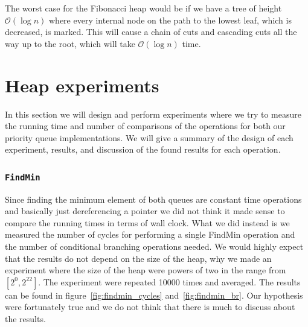 \documentclass[a4paper,oneside,article,11pt]{memoir}
\begin{document}
The worst case for the Fibonacci heap would be if we have a tree of height $\mathcal{O}(\log n)$ where every internal node on the path to the lowest leaf, which is decreased, is marked. This will cause a chain of cuts and cascading cuts all the way up to the root, which will take $\mathcal{O}(\log n)$ time.

\chapter{Heap experiments}
In this section we will design and perform experiments where we try to measure the running time and number of comparisons of the operations for both our priority queue implementations. We will give a summary of the design of each experiment, results, and discussion of the found results for each operation.

\subsection{\texttt{FindMin}}
Since finding the minimum element of both queues are constant time operations and basically just dereferencing a pointer we did not think it made sense to compare the running times in terms of wall clock. What we did instead is we measured the number of cycles for performing a single FindMin operation and the number of conditional branching operations needed. We would highly expect that the results do not depend on the size of the heap, why we made an experiment where the size of the heap were powers of two in the range from $\left[2^0, 2^{22}\right]$. The experiment were repeated 10000 times and averaged. The results can be found in figure~\ref{fig:findmin_cycles} and~\ref{fig:findmin_br}.
Our hypothesis were fortunately true and we do not think that there is much to discuss about the results.
\end{document}
